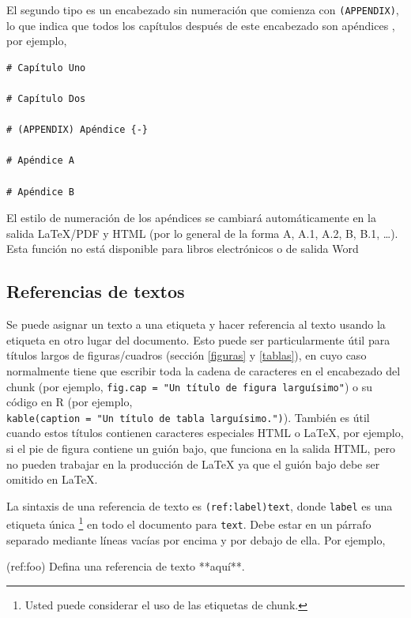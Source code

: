 \documentclass[12pt,]{krantz}
\makeatletter
\newenvironment{Shaded}{\begin{snugshade}}{\end{snugshade}}
\newcommand{\NormalTok}[1]{{#1}}
\newenvironment{kframe}{%
\medskip{}
\setlength{\fboxsep}{.8em}
 \def\at@end@of@kframe{}%
 \ifinner\ifhmode%
  \def\at@end@of@kframe{\end{minipage}}%
  \begin{minipage}{\columnwidth}%
 \fi\fi%
 \def\FrameCommand##1{\hskip\@totalleftmargin \hskip-\fboxsep
 \colorbox{shadecolor}{##1}\hskip-\fboxsep
     \hskip-\linewidth \hskip-\@totalleftmargin \hskip\columnwidth}%
 \MakeFramed {\advance\hsize-\width
   \@totalleftmargin\z@ \linewidth\hsize
   \@setminipage}}%
 {\par\unskip\endMakeFramed%
 \at@end@of@kframe}
\renewenvironment{Shaded}{\begin{kframe}}{\end{kframe}}
\theoremstyle{definition}
\theoremstyle{definition}
\theoremstyle{remark}
\makeatother
\begin{document}
El segundo tipo es un encabezado sin numeración que comienza con
\texttt{(APPENDIX)}, lo que indica que todos los capítulos después de
este encabezado son apéndices , por ejemplo,

\begin{verbatim}
# Capítulo Uno 

# Capítulo Dos

# (APPENDIX) Apéndice {-} 

# Apéndice A

# Apéndice B
\end{verbatim}

El estilo de numeración de los apéndices se cambiará automáticamente en
la salida LaTeX/PDF y HTML (por lo general de la forma A, A.1, A.2, B,
B.1, \ldots{}). Esta función no está disponible para libros electrónicos
o de salida Word

\subsection{Referencias de textos}\label{referencias-de-textos}

Se puede asignar un texto a una etiqueta y hacer referencia al texto
usando la etiqueta en otro lugar del documento. Esto puede ser
particularmente útil para títulos largos de figuras/cuadros (sección
\ref{figuras} y \ref{tablas}), en cuyo caso normalmente tiene que
escribir toda la cadena de caracteres en el encabezado del chunk (por
ejemplo, \texttt{fig.cap\ =\ "Un\ título\ de\ figura\ larguísimo"}) o su
código en R (por ejemplo,
\texttt{kable(caption\ =\ "Un\ título\ de\ tabla\ larguísimo.")}).
También es útil cuando estos títulos contienen caracteres especiales
HTML o LaTeX, por ejemplo, si el pie de figura contiene un guión bajo,
que funciona en la salida HTML, pero no pueden trabajar en la producción
de LaTeX ya que el guión bajo debe ser omitido en LaTeX.

La sintaxis de una referencia de texto es \texttt{(ref:label)text},
donde \texttt{label} es una etiqueta única \footnote{Usted puede
  considerar el uso de las etiquetas de chunk.} en todo el documento
para \texttt{text}. Debe estar en un párrafo separado mediante líneas
vacías por encima y por debajo de ella. Por ejemplo,

\begin{Shaded}
\begin{Highlighting}[]
\NormalTok{(ref:foo) Defina una referencia de texto **aquí**. }
\end{Highlighting}
\end{Shaded}
\end{document}
